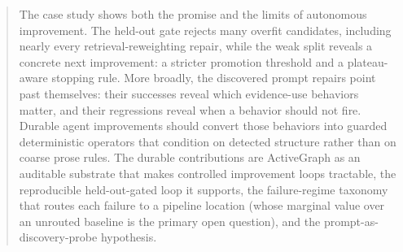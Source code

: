 \documentclass[11pt]{article}
\begin{document}
\begin{abstract}
The case study shows both the promise and the limits of autonomous improvement. The held-out gate rejects many overfit candidates, including nearly every retrieval-reweighting repair, while the weak split reveals a concrete next improvement: a stricter promotion threshold and a plateau-aware stopping rule. More broadly, the discovered prompt repairs point past themselves: their successes reveal which evidence-use behaviors matter, and their regressions reveal when a behavior should not fire. Durable agent improvements should convert those behaviors into guarded deterministic operators that condition on detected structure rather than on coarse prose rules. The durable contributions are ActiveGraph as an auditable substrate that makes controlled improvement loops tractable, the reproducible held-out-gated loop it supports, the failure-regime taxonomy that routes each failure to a pipeline location (whose marginal value over an unrouted baseline is the primary open question), and the prompt-as-discovery-probe hypothesis.
\end{abstract}





\end{document}
